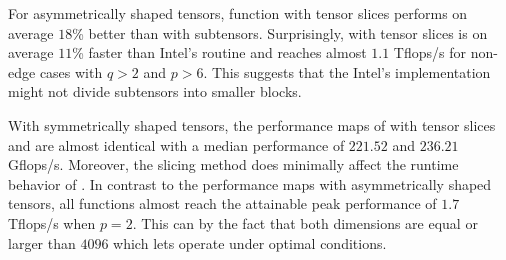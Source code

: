 For asymmetrically shaped tensors, function  with tensor slices performs on average $18$\% better than with subtensors. %
Surprisingly,  with tensor slices is on average $11$\% faster than Intel's  routine and reaches almost $1.1$ Tflops/s for non-edge cases with $q>2$ and $p > 6$.
This suggests that the Intel's implementation might not divide subtensors into smaller blocks.

With symmetrically shaped tensors, the performance maps of  with tensor slices and  are almost identical with a median performance of $221.52$ and $236.21$ Gflops/s.
Moreover, the slicing method does minimally affect the runtime behavior of .
In contrast to the performance maps with asymmetrically shaped tensors, all functions almost reach the attainable peak performance of $1.7$ Tflops/s when $p=2$.
This can by the fact that both dimensions are equal or larger than $4096$ which lets  operate under optimal conditions.

